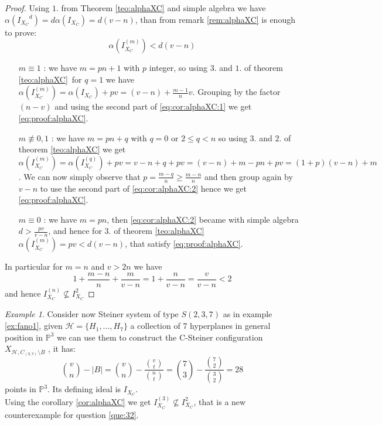 \documentclass[a4wide]{book}
\theoremstyle{plain}
\theoremstyle{remark}
\newtheorem{ex}[rem]{Example}
\theoremstyle{definition}
\newcommand{\PP}{\mathbb{P}}
\newcommand{\HH}{\mathcal{H}}
\DeclareMathOperator*{\eqb }{=}
\newcounter{que}
\begin{document}
 \begin{proof}
 Using $ 1. $ from Theorem \ref{teo:alphaXC} and simple algebra we have $ \alpha({I_{X_C}}^d) = d\alpha(I_{X_C}) = d(v- n) $, than from remark \ref{rem:alphaXC} is enough to prove:
 \begin{equation}\label{eq:proof:alphaXC}
 \alpha(I_{X_C}^{(m)}) < d(v-n)
 \end{equation}
 \begin{itemize}
 \item[$m \equiv 1$ : ] we have $ m = pn + 1 $ with $ p $ integer, so using $ 3. $ and $ 1. $ of theorem \ref{teo:alphaXC} for $ q = 1 $ we have $  \alpha(I_{X_C}^{(m)}) \eqb \alpha(I_{X_C} ) + pv \eqb (v-n) + \frac{m-1}{n}v  $. Grouping by the factor $ (n-v) $ and using the second part of \ref{eq:cor:alphaXC:1} we get \ref{eq:proof:alphaXC}. 
 \item[$m \not\equiv 0,1$ : ] we have $ m = pn + q $ with $ q = 0 $ or $ 2 \leq q < n $ so using $ 3. $ and $ 2. $ of theorem \ref{teo:alphaXC} we get  $  \alpha(I_{X_C}^{(m)}) \eqb \alpha(I_{X_C}^{(q)} ) + pv \eqb v - n + q  +pv = (v - n) + m -pn +pv = (1 + p)(v - n) + m $. We can now simply observe that $ p = \frac{m-q}{n} \geq \frac{m-n}{n} $ and then group again by $ v-n $ to use the second part of \ref{eq:cor:alphaXC:2} hence we get \ref{eq:proof:alphaXC}.
 \item[$ m\equiv 0 $ : ] we have $ m=pn $, then \ref{eq:cor:alphaXC:2} became with simple algebra $ d > \frac{pv}{v-n} $, and hence for $ 3. $ of theorem \ref{teo:alphaXC} $  \alpha(I_{X_C}^{(m)})= pv < d(v-n)$, that satisfy \ref{eq:proof:alphaXC}. 
 \end{itemize}
 In particular for $ m=n $ and $ v > 2n $ we have 
 \[ 1 +\frac{ m - n }{ n } + \frac{ m }{ v - n } = 1 + \frac{ n }{ v - n }= \frac{ v }{ v - n } < 2 \]
 and hence $ I_{X_C}^{(n)} \not \subseteq I_{X_C}^2  $
 \end{proof}
 
 \begin{ex}\label{ex:fano2}
 Consider now Steiner system of type $ S(2,3,7) $ as in example \ref{ex:fano1}, given $ \HH = \{ H_1 , ... , H_7 \} $ a collection of 7 hyperplanes in general position in $ \PP^3 $ we can use them to construct the C-Steiner configuration $ X_{\HH , C_{(3,7)} \setminus B} $ , it has:
 \[
 \binom{v}{n} - |B| = \binom{v}{n} -  \frac{\binom{v}{t}}{\binom{n}{t}} = \binom{7}{3} -  \frac{\binom{7}{2}}{\binom{3}{2}} = 28
 \]
 points in $ \PP^3 $. Its defining ideal is  $ I_{X_C} $. \\
 Using the corollary \ref{cor:alphaXC} we get $ I_{X_C}^{(3)}  \not \subseteq I_{X_C}^2$, that is a new counterexample for question \ref{que:32}. 
 \end{ex}
 
\end{document}
